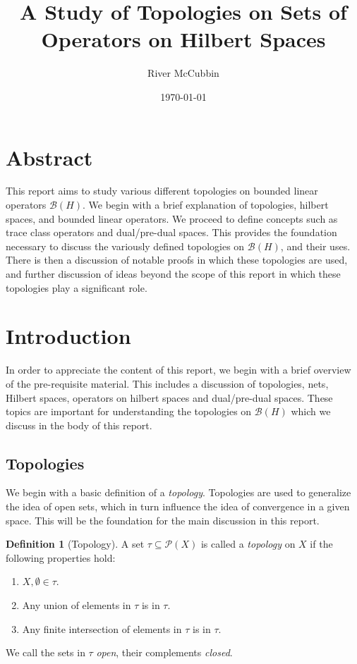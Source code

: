 \documentclass{article}
\title{A Study of Topologies on Sets of Operators on Hilbert Spaces}
\author{River McCubbin}
\date{\today}
\theoremstyle{plain}
\theoremstyle{definition}
\newtheorem{definition}{Definition}
\newcommand{\BH}{\cal{B}(H)}
\renewcommand{\cal}[1]{\mathcal{#1}}
\begin{document}
\maketitle


\section{Abstract} \label{sec:abstract}

        This report aims to study various different topologies on bounded linear operators $\BH$. We begin with a brief explanation of topologies, hilbert spaces, and bounded linear operators. 
        We proceed to define concepts such as trace class operators and dual/pre-dual spaces. 
        This provides the foundation necessary to discuss the variously defined topologies on $\BH$, and their uses. 
        There is then a discussion of notable proofs in which these topologies are used, and further discussion of ideas beyond the scope of this report in which these topologies play a significant role.

\section{Introduction} \label{sec:introduction}

        In order to appreciate the content of this report, we begin with a brief overview of the pre-requisite material.
        This includes a discussion of topologies, nets, Hilbert spaces, operators on hilbert spaces and dual/pre-dual spaces.
        These topics are important for understanding the topologies on $\BH$ which we discuss in the body of this report.

        \subsection{Topologies} \label{subsec:topologies}

                We begin with a basic definition of a \textit{topology}. 
                Topologies are used to generalize the idea of open sets, which in turn influence the idea of convergence in a given space.
                This will be the foundation for the main discussion in this report.

                \begin{definition}[Topology] \label{def:topology}
                        A set $\tau \subseteq \cal{P}(X)$ is called a \textit{topology} on $X$ if the following properties hold:
                        \begin{enumerate}
                        \item $X, \emptyset \in \tau$.
                        \item Any union of elements in $\tau$ is in $\tau$.
                        \item Any finite intersection of elements in $\tau$ is in $\tau$.
                        \end{enumerate}
                \end{definition}
                We call the sets in $\tau$ \textit{open}, their complements \textit{closed}.
\end{document}
